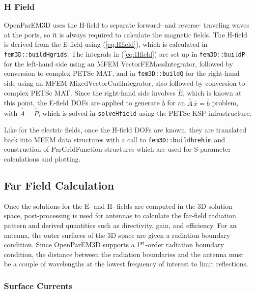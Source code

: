 \documentclass[titlepage]{article}
\renewcommand\_{\textunderscore\linebreak[1]}
\begin{document}
\subsubsection{H Field}

OpenParEM3D uses the H-field to separate forward- and reverse- traveling waves at the ports, so it is always required to calculate the magnetic fields.  The H-field is derived from the E-field using (\ref{eq:Hfield}), which is calculated in \texttt{fem3D::buildHgrids}.  The integrals in (\ref{eq:Hfield}) are set up in \texttt{fem3D::build\_P} for the left-hand side using an MFEM VectorFEMassIntegrator, followed by conversion to complex PETSc MAT, and in \texttt{fem3D::build\_Q} for the right-hand side using an MFEM MixedVectorCurlIntegrator, also followed by conversion to complex PETSc MAT.  Since the right-hand side involves $\overline{E}$, which is known at this point, the E-field DOFs are applied to generate $\overline{b}$ for an $\overline{\overline{A}}\,\overline{x}=\overline{b}$ problem, with $\overline{\overline{A}}=\overline{\overline{P}}$, which is solved in \texttt{solveHfield} using the PETSc KSP infrastructure.

Like for the electric fields, once the H-field DOFs are known, they are translated back into MFEM data structures with a call to \texttt{fem3D::build\_h\_re\_h\_im} and construction of ParGridFunction structures which are used for S-parameter calculations and plotting.

\subsection{Far Field Calculation}

Once the solutions for the E- and H- fields are computed in the 3D solution space, post-processing is used for antennas to calculate the far-field radiation pattern and derived quantities such as directivity, gain, and efficiency.  For an antenna, the outer surfaces of the 3D space are given a radiation boundary condition.  Since OpenParEM3D supports a 1$^{\textnormal{st}}$-order radiation boundary condition, the distance between the radiation boundaries and the antenna must be a couple of wavelengths at the lowest frequency of interest to limit reflections.

\subsubsection{Surface Currents}
\end{document}
